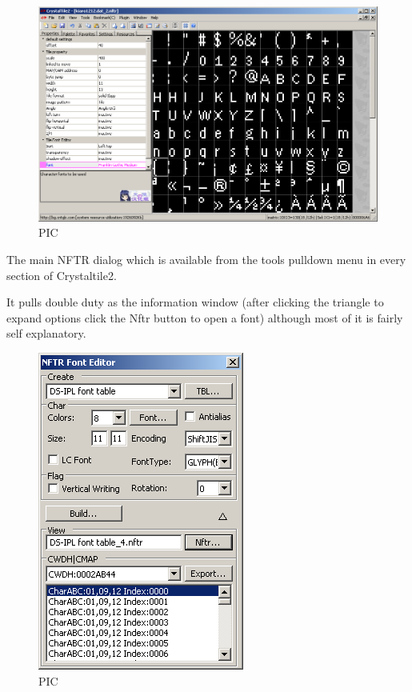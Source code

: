 \documentclass[
]{book}
\begin{document}
\begin{figure}
\centering
\includegraphics{images/111_home_fast6191_romhackingguide_unrenamed_fil___rders_romhackingguidefontnftrcrystaltile2_2.png}
\caption{PIC}
\end{figure}

The main NFTR dialog which is available from the tools pulldown menu in every section of Crystaltile2.

It pulls double duty as the information window (after clicking the triangle to expand options click the Nftr button to open a font) although most of it is fairly self explanatory.

\begin{figure}
\centering
\includegraphics{images/112_home_fast6191_romhackingguide_unrenamed_fil___rders_romhackingguidefontnftrcrystaltile2_3.png}
\caption{PIC}
\end{figure}
\end{document}
